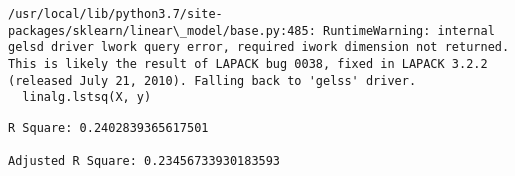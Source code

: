\documentclass[11pt]{article}
\begin{document}
    \begin{Verbatim}[commandchars=\\\{\}]
/usr/local/lib/python3.7/site-packages/sklearn/linear\_model/base.py:485: RuntimeWarning: internal gelsd driver lwork query error, required iwork dimension not returned. This is likely the result of LAPACK bug 0038, fixed in LAPACK 3.2.2 (released July 21, 2010). Falling back to 'gelss' driver.
  linalg.lstsq(X, y)

    \end{Verbatim}

    \begin{Verbatim}[commandchars=\\\{\}]
R Square: 0.2402839365617501 

Adjusted R Square: 0.23456733930183593 


    \end{Verbatim}
\end{document}
